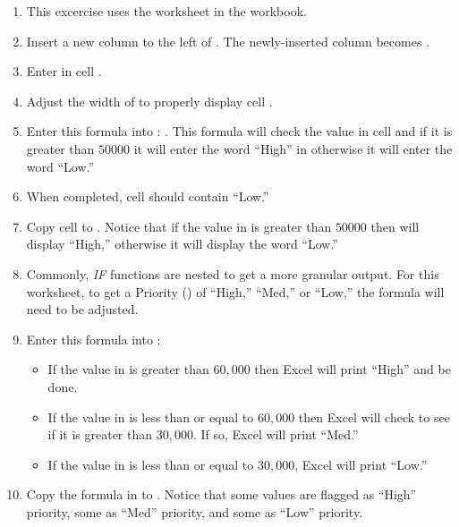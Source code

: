\begin{enumerate}
	\item This excercise uses the  worksheet in the  workbook.
	\item Insert a new column to the left of . The newly-inserted column becomes .
	\item Enter  in cell .
	\item Adjust the width of  to properly display cell .
	\item Enter this formula into : . This formula will check the value in cell  and if it is greater than $ 50000 $ it will enter the word ``High'' in  otherwise it will enter the word ``Low.''
	\item When completed, cell  should contain ``Low.''
	\item Copy cell  to . Notice that if the value in  is greater than $ 50000 $ then  will display ``High,'' otherwise it will display the word ``Low.''
	\item Commonly, \textit{IF} functions are nested to get a more granular output. For this worksheet, to get a Priority () of ``High,'' ``Med,'' or ``Low,'' the formula will need to be adjusted.
	\item Enter this formula into : 
	
	\begin{itemize}
		\item If the value in  is greater than $ 60,000 $ then Excel will print ``High'' and be done.
		\item If the value in  is less than or equal to $ 60,000 $ then Excel will check to see if it is greater than $ 30,000 $. If so, Excel will print ``Med.''
		\item If the value in  is less than or equal to $ 30,000 $, Excel will print ``Low.''
	\end{itemize}

	\item Copy the formula in  to . Notice that some values are flagged as ``High'' priority, some as ``Med'' priority, and some as ``Low'' priority.
	

\end{enumerate}
